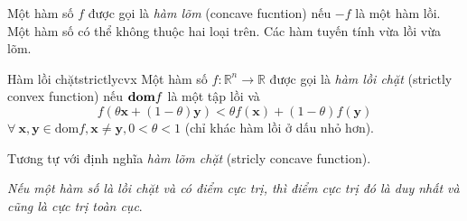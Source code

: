 
Một hàm số $f$ được gọi là \textit{hàm lõm} (concave fucntion) nếu $-f$
là một hàm lồi. Một
hàm số có thể không thuộc hai loại trên. Các hàm tuyến tính vừa lồi vừa lõm.
\begin{mydef}{Hàm lồi chặt}{strictlycvx}
 Một hàm số $f: \mathbb{R}^n \rightarrow \mathbb{R} $ được gọi là
 \textit{hàm lồi chặt} ({strictly convex function}) nếu $\boldsymbol{\mathbf{dom}} f$ là một
 {tập lồi} và
\begin{equation*} 
f(\theta\mathbf{x} + (1 - \theta) \mathbf{y}) < \theta f(\mathbf{x}) + (1 - \theta)f(\mathbf{y}) 
\end{equation*} 
 $\forall~\mathbf{x, y} \in \text{dom}f, \mathbf{x} \neq \mathbf{y},  0 < \theta
< 1$ (chỉ khác hàm lồi ở dấu nhỏ hơn).

\end{mydef}

Tương tự với định nghĩa \textit{hàm lõm chặt} (stricly concave function). 
 
\textit{Nếu một hàm số là \textit{lồi chặt} và có điểm cực trị, thì điểm cực trị đó là duy nhất và cũng là cực trị toàn cục}. 
 
 
